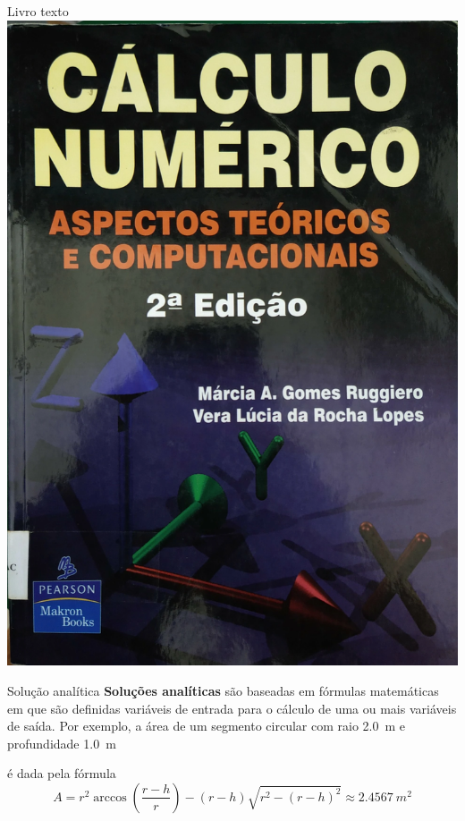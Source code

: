 \begin{frame}{Livro texto}
    \includegraphics[height=0.8\textheight]{images/ruggiero.png}
\end{frame}

\begin{frame}{Solução analítica}
    \textbf{Soluções analíticas} são baseadas em fórmulas matemáticas em que
    são definidas variáveis de entrada para o cálculo de uma ou mais variáveis
    de saída. Por exemplo, a área de um segmento circular com raio \SI{2.0}{m}
    e profundidade \SI{1.0}{m}

    \begin{center}
    \end{center}
    é dada pela fórmula
    \[
        A=r^2 \arccos{\left(\frac{r-h}{r}\right)}-(r-h)\sqrt{r^2-(r-h)^2} 
        \approx \SI{2.4567}{m^2}
    \]
\end{frame}

